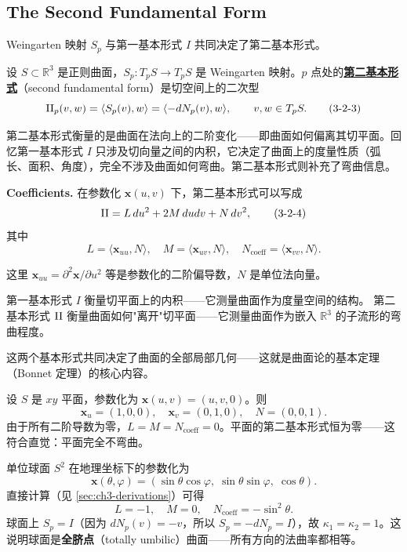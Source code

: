 \subsection{The Second Fundamental Form}\label{sec:second-fundamental-form}

Weingarten 映射 $S_p$ 与第一基本形式 $I$ 共同决定了第二基本形式。

\begin{Definition}\label{def:second-fundamental-form}
设 $S \subset \mathbb{R}^3$ 是正则曲面，$S_p: T_pS \to T_pS$ 是 Weingarten 映射。$p$ 点处的\textbf{\underline{第二基本形式}}（second fundamental form）是切空间上的二次型
\[
\operatorname{II}_p(v, w) = \langle S_p(v), w \rangle = \langle -dN_p(v), w \rangle,\qquad v, w \in T_pS.
\tag{3-2-3}
\]
\end{Definition}

第二基本形式衡量的是曲面在法向上的二阶变化——即曲面如何偏离其切平面。回忆第一基本形式 $I$ 只涉及切向量之间的内积，它决定了曲面上的度量性质（弧长、面积、角度），完全不涉及曲面如何弯曲。第二基本形式则补充了弯曲信息。

\textbf{Coefficients.} 在参数化 $\mathbf{x}(u,v)$ 下，第二基本形式可以写成
\[
\operatorname{II} = L\,du^2 + 2M\,dudv + N\,dv^2,
\tag{3-2-4}
\]
其中
\[
L = \langle \mathbf{x}_{uu}, N \rangle,\quad M = \langle \mathbf{x}_{uv}, N \rangle,\quad N_{\text{coeff}} = \langle \mathbf{x}_{vv}, N \rangle.
\tag{3-2-5}
\]

这里 $\mathbf{x}_{uu} = \partial^2\mathbf{x}/\partial u^2$ 等是参数化的二阶偏导数，$N$ 是单位法向量。

\begin{Remark}[两个基本形式的对比]
第一基本形式 $I$ 衡量切平面上的内积——它测量曲面作为度量空间的结构。
第二基本形式 $\operatorname{II}$ 衡量曲面如何"离开"切平面——它测量曲面作为嵌入 $\mathbb{R}^3$ 的子流形的弯曲程度。

这两个基本形式共同决定了曲面的全部局部几何——这就是曲面论的基本定理（Bonnet 定理）的核心内容。
\end{Remark}

\begin{Example}[平面的第二基本形式]\label{ex:plane-second-form}
设 $S$ 是 $xy$ 平面，参数化为 $\mathbf{x}(u,v) = (u,v,0)$。则
\[
\mathbf{x}_u = (1,0,0),\quad \mathbf{x}_v = (0,1,0),\quad N = (0,0,1).
\]
由于所有二阶导数为零，$L = M = N_{\text{coeff}} = 0$。平面的第二基本形式恒为零——这符合直觉：平面完全不弯曲。
\end{Example}

\begin{Example}[球面的第二基本形式]\label{ex:sphere-second-form}
单位球面 $S^2$ 在地理坐标下的参数化为
\[
\mathbf{x}(\theta,\varphi) = (\sin\theta\cos\varphi,\; \sin\theta\sin\varphi,\; \cos\theta).
\]
直接计算（见 \cref{sec:ch3-derivations}）可得
\[
L = -1,\quad M = 0,\quad N_{\text{coeff}} = -\sin^2\theta.
\tag{3-2-6}
\]
球面上 $S_p = I$（因为 $dN_p(v) = -v$，所以 $S_p = -dN_p = I$），故 $\kappa_1 = \kappa_2 = 1$。这说明球面是\textbf{全脐点}（totally umbilic）曲面——所有方向的法曲率都相等。
\end{Example}

